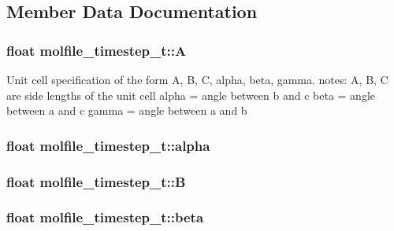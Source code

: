 \subsection{\-Member \-Data \-Documentation}
\hypertarget{structmolfile__timestep__t_a5affc2a7fac90f0e14209b9ffaaa78d8}{
\subsubsection[{\-A}]{\setlength{\rightskip}{0pt plus 5cm}float {\bf molfile\-\_\-timestep\-\_\-t\-::\-A}}}\label{structmolfile__timestep__t_a5affc2a7fac90f0e14209b9ffaaa78d8}
\-Unit cell specification of the form \-A, \-B, \-C, alpha, beta, gamma. notes\-: \-A, \-B, \-C are side lengths of the unit cell alpha = angle between b and c beta = angle between a and c gamma = angle between a and b \hypertarget{structmolfile__timestep__t_a538f77d57dc086e8c35bdcbfe3aee7dc}{
\subsubsection[{alpha}]{\setlength{\rightskip}{0pt plus 5cm}float {\bf molfile\-\_\-timestep\-\_\-t\-::alpha}}}\label{structmolfile__timestep__t_a538f77d57dc086e8c35bdcbfe3aee7dc}
\hypertarget{structmolfile__timestep__t_ad3556bfaf3538b6cec9c0972419cfba1}{
\subsubsection[{\-B}]{\setlength{\rightskip}{0pt plus 5cm}float {\bf molfile\-\_\-timestep\-\_\-t\-::\-B}}}\label{structmolfile__timestep__t_ad3556bfaf3538b6cec9c0972419cfba1}
\hypertarget{structmolfile__timestep__t_a6daa01b5d3f561c7dba3c312ef902768}{
\subsubsection[{beta}]{\setlength{\rightskip}{0pt plus 5cm}float {\bf molfile\-\_\-timestep\-\_\-t\-::beta}}}\label{structmolfile__timestep__t_a6daa01b5d3f561c7dba3c312ef902768}
